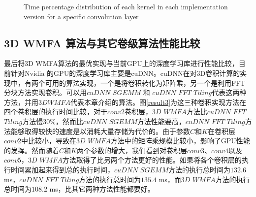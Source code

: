 \begin{figure}[tbh]%
\centering
{}
\caption{Time percentage distribution of each kernel in each implementation version for a specific convolution layer}
\label{result2}
\end{figure}

\subsection{3D WMFA 算法与其它卷级算法性能比较}
最后将3D WMFA算法的最优实现与当前GPU上的深度学习库进行性能比较，目前针对Nvidia 的GPU的深度学习库主要是cuDNN。cuDNN在对3D卷积计算的实现中，有两个可用的算法实现，一个是将卷积转化为矩阵乘，另一个是利用FFT 分块方法实现卷积。可以用$cuDNN$ $SGEMM$ 和 $cuDNN$ $FFT$ $Tiling$代表这两种方法，并用$3D WMFA$代表本章介绍的算法。图\ref{result3}为这三种卷积实现方法在四个卷积层的执行时间比较，对于$conv2$卷积层，$3D$ $WMFA$方法比$cuDNN$ $FFT$ $Tiling$方法慢$30$\%，然而比$cuDNN$ $SGEMM$方法性能要高，$cuDNN$ $FFT$ $Tiling$方法能够取得较快的速度是以消耗大量存储为代价的。由于参数$C$和$K$在卷积层$conv2$中比较小，导致在$3D$ $WMFA$方法中的矩阵乘规模比较小，影响了GPU性能的发挥。然而随着$C$和$K$两个参数的增大，我们看到对卷积层$conv3$、$conv4$以及$conv5$，$3D$ $WMFA$方法取得了比另两个方法更好的性能。如果将各个卷积层的执行时间累加起来得到总的执行时间，$cuDNN$ $SGEMM$方法的执行总时间为$132.6$ ms，$cuDNN$ $FFT$ $Tiling$方法的执行总时间为$135.4$ ms，而$3D$ $WMFA$方法的执行总时间为$108.2$ ms，比其它两种方法性能都要好。

